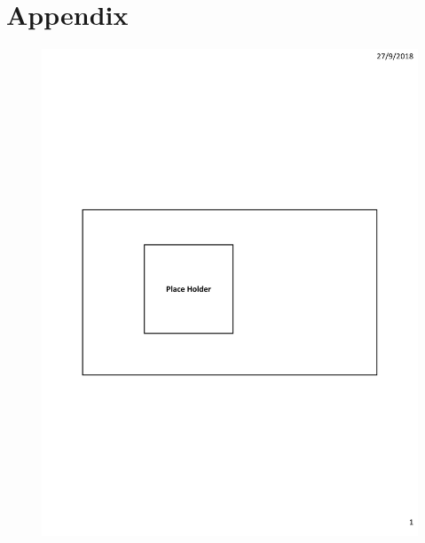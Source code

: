 


\section*{Appendix}

\begin{figure}[h]
	\begin{minipage}{0.18\linewidth}\centering
		\includegraphics[width=\linewidth]{fig/PlaceHolder.pdf}
		\centerline{\dstwitter}
	\end{minipage}
	\hfill
	\begin{minipage}{0.18\linewidth}\centering

\end{minipage}
\end{figure}
